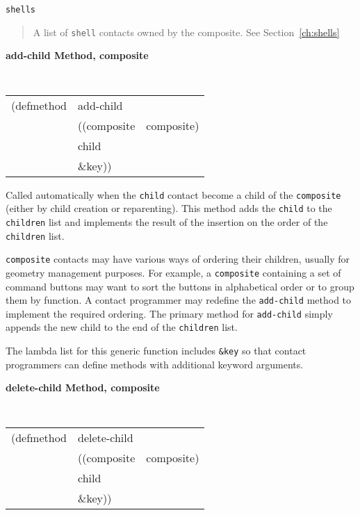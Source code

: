 \documentclass[twoside]{book}
\begin{document}
\begin{sloppy}
\begin{flushright} \parbox[t]{6.125in}{
{\tt shells}
\begin{quote}
A list of {\tt shell} contacts owned by the composite. See Section~\ref{ch:shells}
\end{quote} }\end{flushright}

{\samepage
{\large {\bf add-child \hfill Method, composite}}
\begin{flushright} \parbox[t]{6.125in}{
\tt
\begin{tabular}{lll}
\raggedright
(defmethod & add-child & \\
& ((composite  &composite)\\
& child\\
& \&key))
\end{tabular}
\rm

}\end{flushright}}

\begin{flushright} \parbox[t]{6.125in}{
Called automatically when the {\tt child} contact become a child of
the {\tt composite} (either by child creation or reparenting). This
method  adds the {\tt child} to the {\tt children} list and implements
the result of the insertion on the order of the {\tt children} list. 
}\end{flushright}

\begin{flushright} \parbox[t]{6.125in}{
{\tt composite} contacts may have various ways of ordering their
children, usually for geometry management purposes. For example, a
{\tt composite} containing a set of command buttons may want to sort the
buttons in alphabetical order or to group them by function. A contact
programmer may redefine the {\tt add-child} method to implement the
required ordering. The primary method for {\tt add-child} simply
appends the new child to the end of the  {\tt children} list.

The lambda list for this generic function includes {\tt \&key} so that contact
programmers can define methods with additional keyword arguments.
}\end{flushright}


{\large {\bf delete-child \hfill Method, composite}}
\begin{flushright} \parbox[t]{6.125in}{
\tt
\begin{tabular}{lll}
\raggedright
(defmethod & delete-child & \\
& ((composite  &composite)\\
& child\\
& \&key))
\end{tabular}
\rm

}
\end{flushright}
\end{sloppy}
\end{document}
